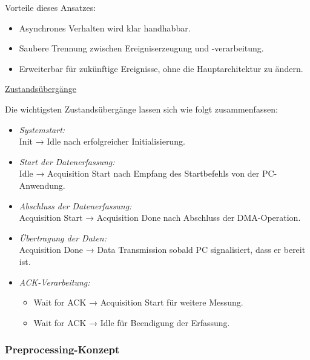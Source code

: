 \documentclass[a4paper, portrait, 12pt]{scrartcl} %
\begin{document}
Vorteile dieses Ansatzes:

\begin{itemize}
	\item Asynchrones Verhalten wird klar handhabbar.
	\item Saubere Trennung zwischen Ereigniserzeugung und -verarbeitung.
	\item Erweiterbar für zukünftige Ereignisse, ohne die Hauptarchitektur zu ändern.
\end{itemize}

\underline{Zustandsübergänge}

Die wichtigsten Zustandsübergänge lassen sich wie folgt zusammenfassen:
\begin{itemize}
	\item \emph{Systemstart:}\\
	Init → Idle nach erfolgreicher Initialisierung.
	\item \emph{Start der Datenerfassung:}\\
	Idle → Acquisition Start nach Empfang des Startbefehls von der PC-Anwendung.
	\item \emph{Abschluss der Datenerfassung:}\\
	Acquisition Start → Acquisition Done nach Abschluss der DMA-Operation.
	\item \emph{Übertragung der Daten:}\\
	Acquisition Done → Data Transmission sobald PC signalisiert, dass er bereit ist.
	\item \emph{ACK-Verarbeitung:}
	\begin{itemize}
	\item Wait for ACK → Acquisition Start für weitere Messung.
	\item Wait for ACK → Idle für Beendigung der Erfassung.
	\end{itemize}
\end{itemize}
\pagebreak


\subsubsection{Preprocessing-Konzept}
\label{subsubsec:preprocessing_concept}
\end{document}
